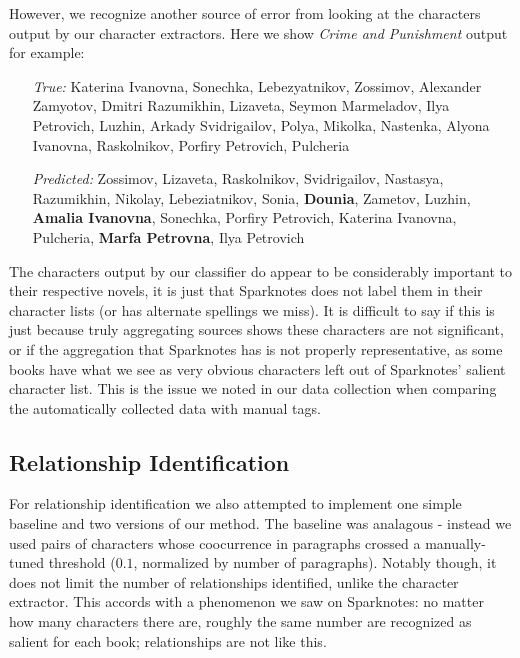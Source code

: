 \documentclass[12pt]{article}
\begin{document}
        However, we recognize another source of error from looking at the characters output by our
        character extractors. Here we show \emph{Crime and Punishment} output for example:
    
        \begin{itemize}
            \item[\emph{True:}]
                Katerina Ivanovna, Sonechka, Lebezyatnikov, Zossimov, Alexander Zamyotov, Dmitri Razumikhin, Lizaveta, Seymon Marmeladov, Ilya Petrovich, Luzhin, Arkady Svidrigailov, Polya, Mikolka, Nastenka, Alyona Ivanovna, Raskolnikov, Porfiry Petrovich, Pulcheria
            \item[\emph{Predicted:}]
                Zossimov, Lizaveta, Raskolnikov, Svidrigailov, Nastasya, Razumikhin, Nikolay, Lebeziatnikov, Sonia, \textbf{Dounia}, Zametov, Luzhin, \textbf{Amalia Ivanovna}, Sonechka, Porfiry Petrovich, Katerina Ivanovna, Pulcheria, \textbf{Marfa Petrovna}, Ilya Petrovich 
        \end{itemize}

        The characters output by our classifier do appear to be considerably important to their
        respective novels, it is just that Sparknotes does not label them in their character lists (or has alternate spellings we miss).
        It is difficult to say if this is just because truly aggregating sources shows these
        characters are not significant, or if the aggregation that Sparknotes has is not properly
        representative, as some books have what we see as very obvious characters left
        out of Sparknotes' salient character list. This is the issue we noted in our data
        collection when comparing the automatically collected data with manual tags. 

    \subsection{Relationship Identification}

        For relationship identification we also attempted to implement one simple baseline and two versions of our method.
        The baseline was analagous - instead we used pairs of characters whose coocurrence in paragraphs crossed 
        a manually-tuned threshold ($0.1$, normalized by number of paragraphs). Notably though, it does not
        limit the number of relationships identified, unlike the character extractor. This accords with a
        phenomenon we saw on Sparknotes: no matter how many characters there are, roughly the same number
        are recognized as salient for each book; relationships are not like this. \\
\end{document}

